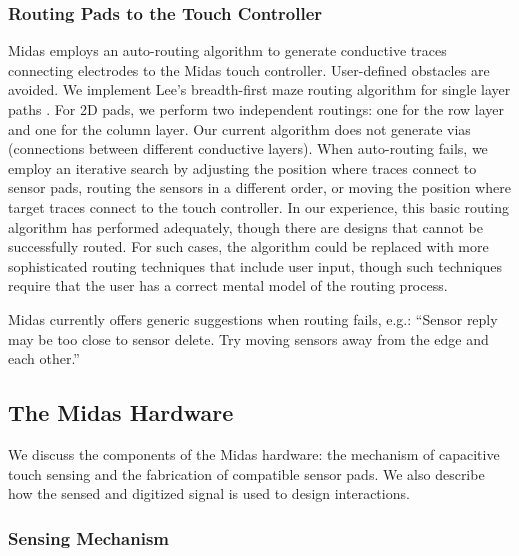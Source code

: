         \subsubsection{Routing Pads to the Touch Controller}
Midas employs an auto-routing algorithm to generate conductive
traces connecting electrodes to the Midas touch controller.
User-defined obstacles are avoided. We implement
Lee's breadth-first maze routing algorithm for single layer
paths \cite{lee-maze}. For 2D pads, we perform two independent routings:
one for the row layer and one for the column layer. Our
current algorithm does not generate vias (connections between
different conductive layers). When auto-routing fails,
we employ an iterative search by adjusting the position where
traces connect to sensor pads, routing the sensors in a different
order, or moving the position where target traces connect
to the touch controller. In our experience, this basic routing
algorithm has performed adequately, though there are designs
that cannot be successfully routed. For such cases, the
algorithm could be replaced with more sophisticated routing
techniques that include user input, though such techniques
require that the user has a correct mental model of the routing
process.

Midas currently offers generic suggestions when routing fails,
e.g.: “Sensor reply may be too close to sensor delete. Try
moving sensors away from the edge and each other.”


    \subsection{The Midas Hardware}

We discuss the components of the Midas hardware: the mechanism of capacitive touch sensing and the fabrication of compatible sensor pads. We also describe how the sensed and digitized signal is used to design interactions.

    \subsubsection{Sensing Mechanism}

